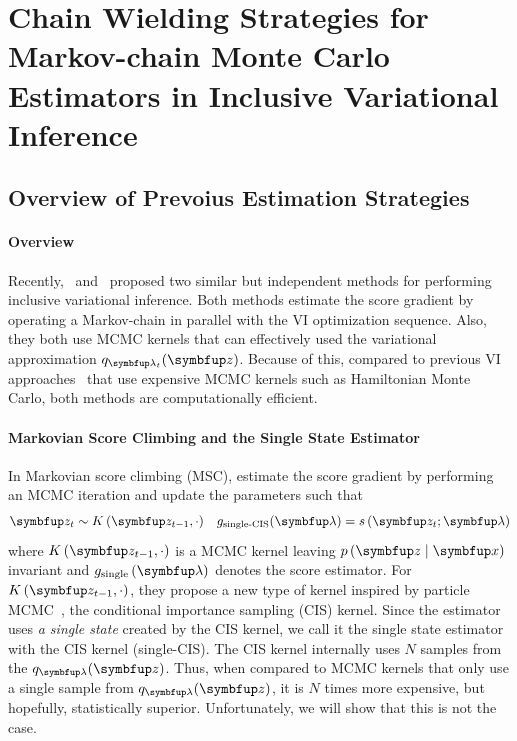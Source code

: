 
\section{Chain Wielding Strategies for Markov-chain Monte Carlo Estimators in Inclusive Variational Inference}
\vspace{-0.05in}
\subsection{Overview of Prevoius Estimation Strategies}\label{section:jsa_msc}
%
\vspace{-0.05in}

\paragraph{Overview}
Recently,~\citeauthor{NEURIPS2020_b2070693} and~\citeauthor{pmlr-v124-ou20a} proposed two similar but independent methods for performing inclusive variational inference.
Both methods estimate the score gradient by operating a Markov-chain in parallel with the VI optimization sequence.
Also, they both use MCMC kernels that can effectively used the variational approximation \(q_{\vlambda_t}(\vz)\).
Because of this, compared to previous VI approaches~\citep{pmlr-v97-ruiz19a, pmlr-v70-hoffman17a} that use expensive MCMC kernels such as Hamiltonian Monte Carlo, both methods are computationally efficient. 

\vspace{-0.05in}
\paragraph{Markovian Score Climbing and the Single State Estimator}
In Markovian score climbing (MSC), \citep{NEURIPS2020_b2070693} estimate the score gradient by performing an MCMC iteration and update the parameters such that
\vspace{-0.05in}
\begin{align}
  &\vz_t \sim K\left(\vz_{t-1}, \cdot \right) &g_{\text{single-CIS}}(\vlambda) = s\,(\vz_t; \vlambda)
\end{align}
where \(K\left(\vz_{t-1}, \cdot\right)\) is a MCMC kernel leaving \(p\,(\vz\mid\vx)\) invariant and \(g_{\text{single}}\left(\vlambda\right)\) denotes the score estimator.
For \(K\left(\vz_{t-1}, \cdot\right)\), they propose a new type of kernel inspired by particle MCMC~\cite{andrieu_particle_2010}, the conditional importance sampling (CIS) kernel.
Since the estimator uses \textit{a single state} created by the CIS kernel, we call it the single state estimator with the CIS kernel (single-CIS).
The CIS kernel internally uses \(N\) samples from the \(q_{\vlambda}(\vz)\).
Thus, when compared to MCMC kernels that only use a single sample from \(q_{\vlambda}(\vz)\), it is \(N\) times more expensive, but hopefully, statistically superior.
Unfortunately, we will show that this is not the case.

